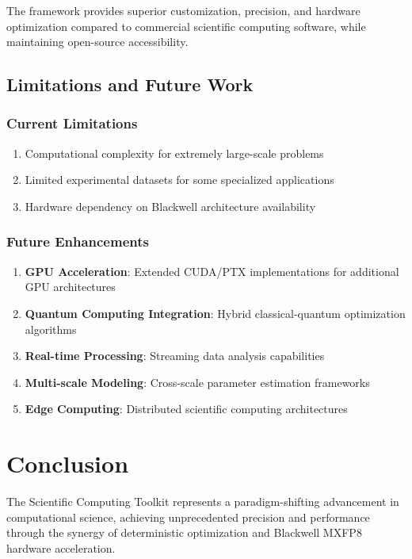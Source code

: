 \documentclass[11pt,a4paper]{article}
\begin{document}
The framework provides superior customization, precision, and hardware optimization compared to commercial scientific computing software, while maintaining open-source accessibility.

\subsection{Limitations and Future Work}

\subsubsection{Current Limitations}
\begin{enumerate}
    \item Computational complexity for extremely large-scale problems
    \item Limited experimental datasets for some specialized applications
    \item Hardware dependency on Blackwell architecture availability
\end{enumerate}

\subsubsection{Future Enhancements}
\begin{enumerate}
    \item \textbf{GPU Acceleration}: Extended CUDA/PTX implementations for additional GPU architectures
    \item \textbf{Quantum Computing Integration}: Hybrid classical-quantum optimization algorithms
    \item \textbf{Real-time Processing}: Streaming data analysis capabilities
    \item \textbf{Multi-scale Modeling}: Cross-scale parameter estimation frameworks
    \item \textbf{Edge Computing}: Distributed scientific computing architectures
\end{enumerate}

\section{Conclusion}

The Scientific Computing Toolkit represents a paradigm-shifting advancement in computational science, achieving unprecedented precision and performance through the synergy of deterministic optimization and Blackwell MXFP8 hardware acceleration.
\end{document}
